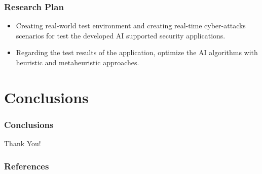 \documentclass[slidestop,usepdftitle=false]{beamer}
\begin{document}
\begin{frame}
  \frametitle{Research Plan} 
   \begin{slide}
    \begin{itemize}
      \item {
        Creating real-world test environment and creating real-time cyber-attacks scenarios for test the developed AI supported security applications.
    }
 
    \item {
        Regarding the test results of the application, optimize the AI algorithms with heuristic and metaheuristic approaches.  
    }
     \end{itemize}
   \end{slide}
\end{frame}

\section{Conclusions}  
  \begin{frame}%
  \frametitle{Conclusions}  
  \begin{center}
  {\fontsize{42.99}{50}\selectfont Thank You!}
  \end{center}
  \end{frame}

\begin{frame}[allowframebreaks]
    \frametitle{References}
    
\end{frame}
\end{document}
